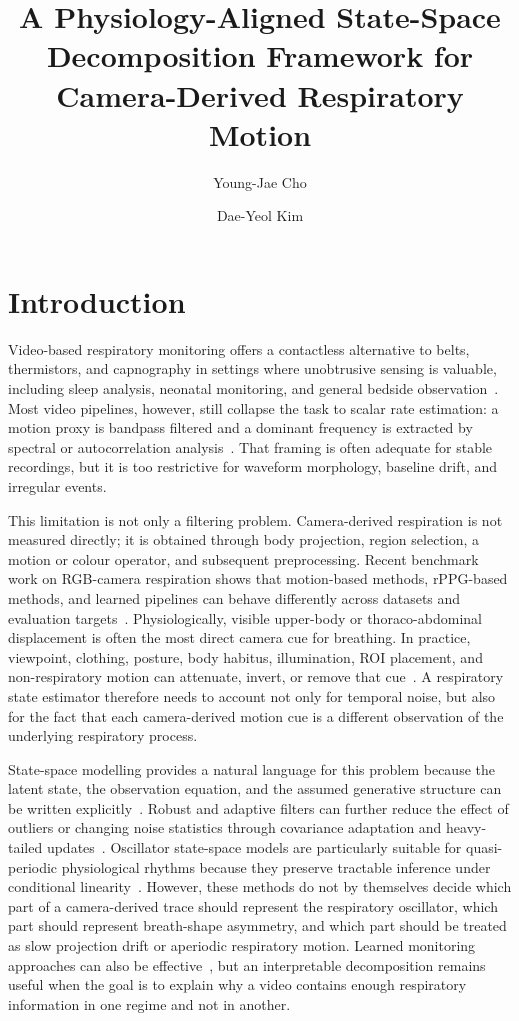 \documentclass[fleqn,10pt]{wlscirep}
\title{A Physiology-Aligned State-Space Decomposition Framework for Camera-Derived Respiratory Motion}
\author[1]{Young-Jae Cho}
\author[2,*]{Dae-Yeol Kim}
\affil[1]{Master's Program in AI Computer Engineering, Department of Electrical, Electronic and Computer Engineering, University of Ulsan, Ulsan, Republic of Korea}
\affil[2]{School of ICT Convergence, University of Ulsan, Ulsan, Republic of Korea}
\affil[*]{daeyeol@ulsan.ac.kr}
\begin{document}
\flushbottom
\maketitle
\thispagestyle{empty}

\section*{Introduction}
Video-based respiratory monitoring offers a contactless alternative to belts,
thermistors, and capnography in settings where unobtrusive sensing is valuable,
including sleep analysis, neonatal monitoring, and general bedside
observation~\cite{Bartula2013,Tarassenko2014,Janssen2016}. Most video pipelines,
however, still collapse the task to scalar rate estimation: a motion proxy is
bandpass filtered and a dominant frequency is extracted by spectral or
autocorrelation analysis~\cite{Li2014optical,Bai2021,Welch1967}. That framing
is often adequate for stable recordings, but it is too restrictive for
waveform morphology, baseline drift, and irregular events.

This limitation is not only a filtering problem. Camera-derived respiration is
not measured directly; it is obtained through body projection, region
selection, a motion or colour operator, and subsequent preprocessing. Recent
benchmark work on RGB-camera respiration shows that motion-based methods,
rPPG-based methods, and learned pipelines can behave differently across
datasets and evaluation targets~\cite{Boccignone2025Review}. Physiologically,
visible upper-body or thoraco-abdominal displacement is often the most direct
camera cue for breathing. In practice, viewpoint, clothing, posture, body
habitus, illumination, ROI placement, and non-respiratory motion can attenuate,
invert, or remove that cue~\cite{Wang2021AlgorithmicRespiration}. A respiratory
state estimator therefore needs to account not only for temporal noise, but
also for the fact that each camera-derived motion cue is a different
observation of the underlying respiratory process.

State-space modelling provides a natural language for this problem because the
latent state, the observation equation, and the assumed generative structure can
be written explicitly~\cite{Harvey1989,DurbinKoopman2012,Sarkka2013}. Robust
and adaptive filters can further reduce the effect of outliers or changing
noise statistics through covariance adaptation and heavy-tailed
updates~\cite{Mehra1970,MohamedSchwarz1999,Piche2012,Roth2017,Huang2017}.
Oscillator state-space models are particularly suitable for quasi-periodic
physiological rhythms because they preserve tractable inference under
conditional linearity~\cite{Sarkka2012DRIFTER,Somata2018,Sarkka2013,SolinSarkka2014}.
However, these methods do not by themselves decide which part of a
camera-derived trace should represent the respiratory oscillator, which part
should represent breath-shape asymmetry, and which part should be treated as
slow projection drift or aperiodic respiratory motion. Learned monitoring
approaches can also be effective~\cite{Chaichulee2017,Perepelkina2020}, but an
interpretable decomposition remains useful when the goal is to explain why a
video contains enough respiratory information in one regime and not in another.
\end{document}
